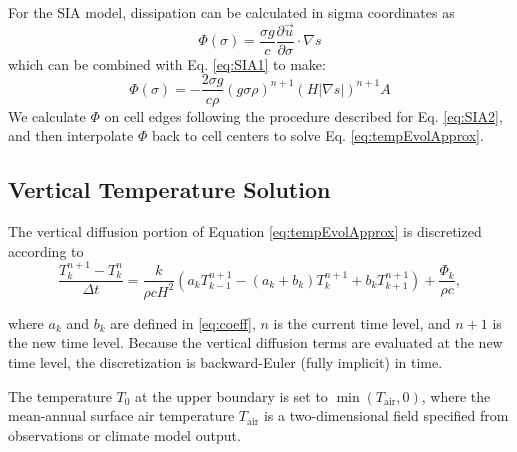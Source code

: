 
For the SIA model, dissipation can be calculated in sigma coordinates as
\begin{equation}
  \label{eq:dissipation_sia}
  \Phi(\sigma) = \frac{\sigma g}{c} \frac{\partial \vec{u}}{\partial \sigma} \cdot \nabla s
\end{equation}
which can be combined with Eq. \ref{eq:SIA1} to make:
\begin{equation}
  \label{eq:dissipation_sia2}
  \Phi(\sigma) = -\frac{2\sigma g}{c \rho} (g \sigma \rho)^{n+1} (H |\nabla s|)^{n+1} A
\end{equation}
We calculate $\Phi$ on cell edges following the procedure described for Eq. \ref{eq:SIA2}, and then interpolate $\Phi$ back to cell centers to solve Eq. \ref{eq:tempEvolApprox}.

\subsection{Vertical Temperature Solution}
\label{sec:Tvert}

The vertical diffusion portion of Equation \ref{eq:tempEvolApprox} is discretized according to
\begin{equation}
  \label{eq:vertTempDisc}
  \frac{T_{k}^{n+1}-T_{k}^{n}}{\Delta t} =
  \frac{k}{\rho c H^2}\left( {{a}_{k}}T_{k-1}^{n+1}-({{a}_{k}}+{{b}_{k}})T_{k}^{n+1}+{{b}_{k}}T_{k+1}^{n+1} \right)+\frac{{{\Phi}_{k}}}{\rho c},
\end{equation}

\noindent
where $a_k$ and $b_k$ are defined in \eqref{eq:coeff}, $n$ is the current time level,
and $n+1$ is the new time level. Because the vertical diffusion terms are evaluated at the new time level, the discretization is backward-Euler (fully implicit) in time.

The temperature $T_0$ at the upper boundary is set to
$\min(T_\mathrm{air},0)$, where the mean-annual surface air temperature $T_{\mathrm{air}}$ is a two-dimensional field specified from observations or climate model output.
%

